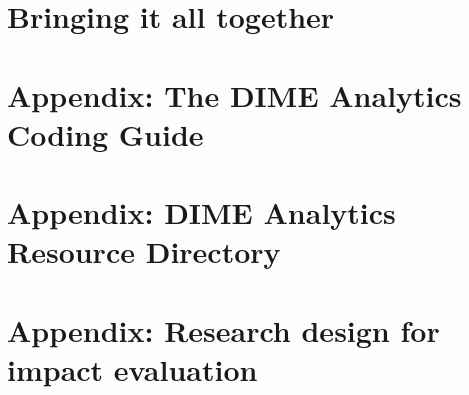 
\chapter*{Bringing it all together} %




\chapter{Appendix: The DIME Analytics Coding Guide}
\label{ap:1}




\chapter{Appendix: DIME Analytics Resource Directory}
\label{ap:2}





\chapter{Appendix: Research design for impact evaluation}
\label{ap:3}




